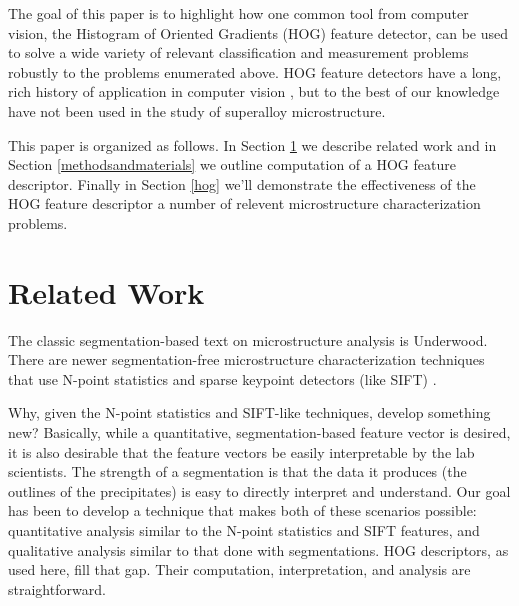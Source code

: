 \documentclass[review]{elsarticle}
\begin{document}
		The goal of this paper is to highlight how one common tool from computer vision, the Histogram of Oriented Gradients (HOG) feature detector, can be used to solve a wide variety of relevant classification and measurement problems robustly to the problems enumerated above. HOG feature detectors have a long, rich history of application in computer vision \cite{gradtex, hog, girsh}, but to the best of our knowledge have not been used in the study of superalloy microstructure.

		This paper is organized as follows. In Section \ref{relatedwork} we describe related work and in Section \ref{methodsandmaterials} we outline computation of a HOG feature descriptor. Finally in Section \ref{hog} we'll demonstrate the effectiveness of the HOG feature descriptor a number of relevent microstructure characterization problems.
	
	\section{Related Work}\label{relatedwork}
		The classic segmentation-based text on microstructure analysis is Underwood\cite{underwood}. There are newer segmentation-free microstructure characterization techniques that use N-point statistics \cite{kalidindi1, kalidindi2} and sparse keypoint detectors (like SIFT) \cite{decost}.

		Why, given the N-point statistics and SIFT-like techniques, develop something new? Basically, while a quantitative, segmentation-based feature vector is desired, it is also desirable that the feature vectors be easily interpretable by the lab scientists. The strength of a segmentation is that the data it produces (the outlines of the precipitates) is easy to directly interpret and understand. Our goal has been to develop a technique that makes both of these scenarios possible: quantitative analysis similar to the N-point statistics and SIFT features, and qualitative analysis similar to that done with segmentations. HOG descriptors, as used here, fill that gap. Their computation, interpretation, and analysis are straightforward.
	
	
	
	
\end{document}
